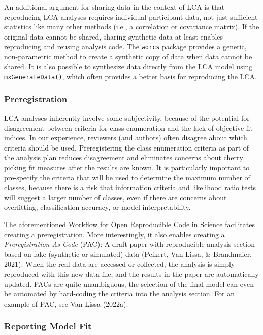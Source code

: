 \documentclass[
  ,man,floatsintext]{apa6}
\begin{document}
An additional argument for sharing data in the context of LCA is that reproducing LCA analyses requires individual participant data,
not just sufficient statistics like many other methods (i.e., a correlation or covariance matrix).
If the original data cannot be shared,
sharing synthetic data at least enables reproducing and reusing analysis code.
The \texttt{worcs} package provides a generic, non-parametric method to create a synthetic copy of data when data cannot be shared.
It is also possible to synthesize data directly from the LCA model using \texttt{mxGenerateData()},
which often provides a better basis for reproducing the LCA.

\hypertarget{preregistration}{%
\subsubsection{Preregistration}\label{preregistration}}

LCA analyses inherently involve some subjectivity,
because of the potential for disagreement between criteria for class enumeration and the lack of objective fit indices.
In our experience, reviewers (and authors) often disagree about which criteria should be used.
Preregistering the class enumeration criteria as part of the analysis plan reduces disagreement and eliminates concerns about cherry picking fit measures after the results are known.
It is particularly important to pre-specify the criteria that will be used to determine the maximum number of classes,
because there is a risk that information criteria and likelihood ratio tests will suggest a larger number of classes, even if there are concerns about overfitting, classification accuracy, or model interpretability.

The aforementioned Workflow for Open Reproducible Code in Science facilitates creating a preregistration.
More interestingly, it also enables creating a \emph{Preregistration As Code} (PAC):
A draft paper with reproducible analysis section based on fake (synthetic or simulated) data (Peikert, Van Lissa, \& Brandmaier, 2021).
When the real data are accessed or collected,
the analysis is simply reproduced with this new data file,
and the results in the paper are automatically updated.
PACs are quite unambiguous; the selection of the final model can even be automated by hard-coding the criteria into the analysis section.
For an example of PAC, see Van Lissa (2022a).

\hypertarget{reporting-model-fit}{%
\subsubsection{Reporting Model Fit}\label{reporting-model-fit}}
\end{document}
